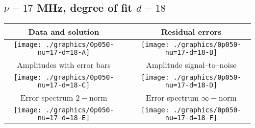 

% 

\clearpage{}
\break{}

\subsection{$\nu = 17$ MHz, degree of fit $d = 18$}

\begin{table}[h]
    \begin{center}
        \begin{tabular}{ccc}
            Data and solution & \quad & Residual errors \\\hline
            \texttt{[image: ./graphics/0p050-nu=17-d=18-A]} &&
            \texttt{[image: ./graphics/0p050-nu=17-d=18-B]} \\[15pt]
            Amplitudes with error bars && Amplitude signal--to--noise \\\hline
            \texttt{[image: ./graphics/0p050-nu=17-d=18-C]} &&
            \texttt{[image: ./graphics/0p050-nu=17-d=18-D]} \\[15pt]
            Error spectrum $2-$norm && Error spectrum $\infty-$norm \\\hline
            \texttt{[image: ./graphics/0p050-nu=17-d=18-E]} &&
            \texttt{[image: ./graphics/0p050-nu=17-d=18-F]} \\[15pt]
        \end{tabular}
    \end{center}
\label{fig:elev=50, nu=17}
\end{table}



\endinput
